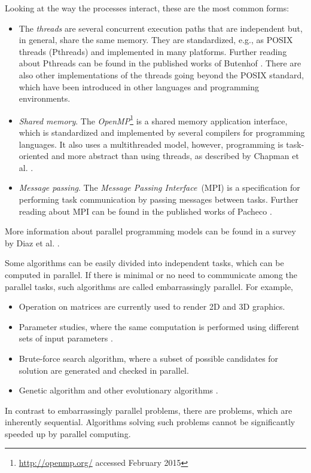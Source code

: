 Looking at the way the processes interact, these are the most common forms:
\begin{itemize}
\item{The \emph{threads} are several concurrent execution paths that are independent but, in general, share the same memory. They are standardized, e.g., as POSIX threads (Pthreads) and implemented in many platforms. Further reading about Pthreads can be found in the published works of Butenhof \cite{Butenhof1997}. There are also other implementations of the threads going beyond the POSIX standard, which have been introduced in other languages and programming environments.}
\item{\emph{Shared memory}. The \emph{OpenMP}\footnote{\url{http://openmp.org/} accessed February 2015} is a shared memory application interface, which is standardized and implemented by several compilers for programming languages. It also uses a multithreaded model, however, programming is task-oriented and more abstract than using threads, as described by Chapman et al. \cite{Chapman2008}. }
\item{\emph{Message passing}. The \emph{Message Passing Interface}~(MPI) is a specification for performing task communication by passing messages between tasks. Further reading about MPI can be found in the published works of Pacheco \cite{Pacheco1997}.
}
\end{itemize}
More information about parallel programming models can be found in a survey by Diaz et al. \cite{Diaz2012}.

Some algorithms can be easily divided into independent tasks, which can be computed in parallel. If there is minimal or no need to communicate among the parallel tasks, such algorithms are called embarrassingly parallel. For example, 
\begin{itemize}
\item{Operation on matrices  \cite{Moler1986} are currently used to render 2D and 3D graphics.}
\item{Parameter studies, where the same computation is performed using different sets of input parameters \cite{Foster1995}.}
\item{Brute-force search algorithm, where a subset of possible candidates for solution are generated and checked in parallel.}
\item{Genetic algorithm and other evolutionary algorithms \cite{Cantu-Paz1999}.}
\end{itemize}
In contrast to embarrassingly parallel problems, there are problems, which are inherently sequential. Algorithms solving such problems cannot be significantly speeded up by parallel computing. %

